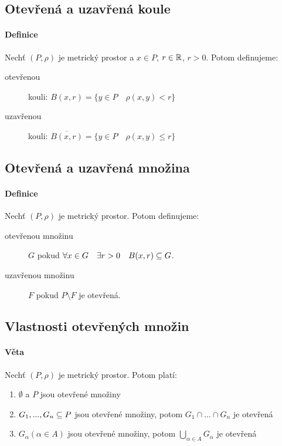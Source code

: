 \documentclass[a4paper,10pt]{article}
\begin{document}
\subsection{Otevřená a uzavřená koule}
\setcounter{equation}{0}
\paragraph{Definice}
Nechť $(P, \rho)$ je metrický prostor a $x \in P$, $r \in \mathbb{R}$, $r > 0$. Potom
definujeme:
\begin{description}
	\item[otevřenou] kouli: 
		$B(x, r) = \{ y \in P\quad \rho(x,y) < r\}$
	\item[uzavřenou] kouli: 
		$\overline{B(x, r)} = \{ y \in P\quad \rho(x,y) \le r\}$
\end{description}


\subsection{Otevřená a uzavřená množina}
\setcounter{equation}{0}
\paragraph{Definice}
Nechť $(P, \rho)$ je metrický prostor. Potom definujeme:
\begin{description}
	\item[otevřenou množinu] $G$ pokud $\forall x \in G \quad \exists r > 0 \quad
	B(x,r) \subseteq G$.
	\item[uzavřenou množinu] $F$ pokud $P \setminus F$ je otevřená.
\end{description}

\subsection{Vlastnosti otevřených množin}
\setcounter{equation}{0}
\paragraph{Věta}
Nechť $(P, \rho)$ je metrický prostor. Potom platí:
\begin{enumerate}
	\item $\emptyset$ a $P$ jsou otevřené množiny
	\item $G_1, ..., G_n \subseteq P$ jsou otevřené množiny, potom $G_1 \cap ... \cap
	G_n$ 	je otevřená
	\item $G_\alpha (\alpha \in A)$ jsou otevřené množiny, potom $\bigcup_{\alpha \in
	A} G_\alpha$ je otevřená
\end{enumerate}
\end{document}
